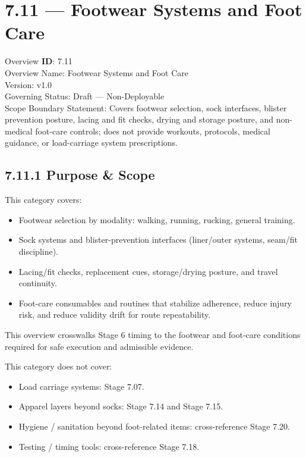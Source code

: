 \documentclass[10pt]{article}
\begin{document}
\section*{7.11 — Footwear Systems and Foot Care}
{}

Overview \textbf{ID}: 7.11\\
Overview Name: Footwear Systems and Foot Care\\
Version: v1.0\\
Governing Status: Draft — Non-Deployable\\
Scope Boundary Statement: Covers footwear selection, sock interfaces, blister prevention posture, lacing and fit checks, drying and storage posture, and non-medical foot-care controls; does not provide workouts, protocols, medical guidance, or load-carriage system prescriptions.

\subsection*{7.11.1 Purpose \& Scope}
{}

This category covers:

\begin{itemize}
\item Footwear selection by modality: walking, running, rucking, general training.
\item Sock systems and blister-prevention interfaces (liner/outer systems, seam/fit discipline).
\item Lacing/fit checks, replacement cues, storage/drying posture, and travel continuity.
\item Foot-care consumables and routines that stabilize adherence, reduce injury risk, and reduce validity drift for route repeatability.
\end{itemize}

This overview crosswalks Stage 6 timing to the footwear and foot-care conditions required for safe execution and admissible evidence.

This category does not cover:

\begin{itemize}
\item Load carriage systems: Stage 7.07.
\item Apparel layers beyond socks: Stage 7.14 and Stage 7.15.
\item Hygiene / sanitation beyond foot-related items: cross-reference Stage 7.20.
\item Testing / timing tools: cross-reference Stage 7.18.
\end{itemize}
\end{document}
